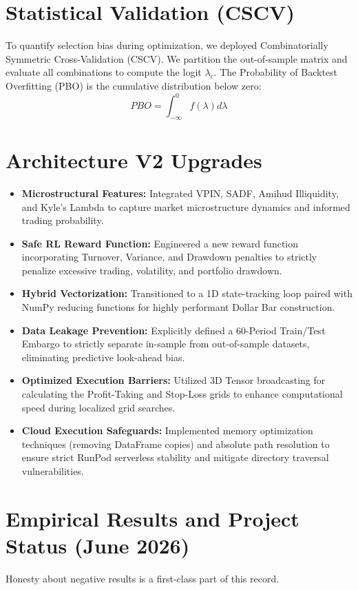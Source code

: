 \documentclass[12pt, a4paper]{article}
\begin{document}
\section{Statistical Validation (CSCV)}
To quantify selection bias during optimization, we deployed Combinatorially Symmetric Cross-Validation (CSCV). We partition the out-of-sample matrix and evaluate all combinations to compute the logit $\lambda_c$. The Probability of Backtest Overfitting (PBO) is the cumulative distribution below zero:
$$ PBO = \int_{-\infty}^{0} f(\lambda) d\lambda $$

\section{Architecture V2 Upgrades}
\begin{itemize}
    \item \textbf{Microstructural Features:} Integrated VPIN, SADF, Amihud Illiquidity, and Kyle's Lambda to capture market microstructure dynamics and informed trading probability.
    \item \textbf{Safe RL Reward Function:} Engineered a new reward function incorporating Turnover, Variance, and Drawdown penalties to strictly penalize excessive trading, volatility, and portfolio drawdown.
    \item \textbf{Hybrid Vectorization:} Transitioned to a 1D state-tracking loop paired with NumPy reducing functions for highly performant Dollar Bar construction.
    \item \textbf{Data Leakage Prevention:} Explicitly defined a 60-Period Train/Test Embargo to strictly separate in-sample from out-of-sample datasets, eliminating predictive look-ahead bias.
    \item \textbf{Optimized Execution Barriers:} Utilized 3D Tensor broadcasting for calculating the Profit-Taking and Stop-Loss grids to enhance computational speed during localized grid searches.
    \item \textbf{Cloud Execution Safeguards:} Implemented memory optimization techniques (removing DataFrame copies) and absolute path resolution to ensure strict RunPod serverless stability and mitigate directory traversal vulnerabilities.
\end{itemize}

\section{Empirical Results and Project Status (June 2026)}
Honesty about negative results is a first-class part of this record.
\end{document}
